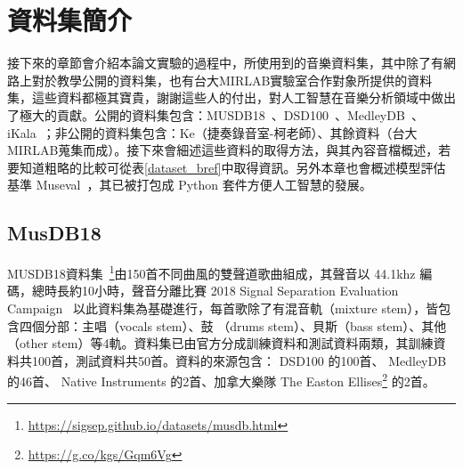 \chapter{資料集簡介}
接下來的章節會介紹本論文實驗的過程中，所使用到的音樂資料集，其中除了有網路上對於教學公開的資料集，也有台大MIRLAB實驗室合作對象所提供的資料集，這些資料都極其寶貴，謝謝這些人的付出，對人工智慧在音樂分析領域中做出了極大的貢獻。公開的資料集包含：MUSDB18~\cite{rafii2017musdb18,musdb18}、DSD100~\cite{SiSEC16}、MedleyDB~\cite{bittner2014medleydb}、iKala~\cite{chan2015vocal}；非公開的資料集包含：Ke（捷奏錄音室-柯老師）、其餘資料（台大MIRLAB蒐集而成）。接下來會細述這些資料的取得方法，與其內容音檔概述，若要知道粗略的比較可從表\ref{dataset_bref}中取得資訊。另外本章也會概述模型評估基準 Museval~\cite{stoter20182018}，其已被打包成 Python 套件方便人工智慧的發展。

\begin{table}[h!]
\centering
{}
\caption{資料集概述}
\label{dataset_bref}
\end{table}

\section{MusDB18}
MUSDB18資料集~\cite{rafii2017musdb18,musdb18}\footnote{\url{https://sigsep.github.io/datasets/musdb.html}}由150首不同曲風的雙聲道歌曲組成，其聲音以 44.1khz 編碼，總時長約10小時，聲音分離比賽 2018 Signal Separation Evaluation Campaign~\cite{stoter20182018} 以此資料集為基礎進行，每首歌除了有混音軌（mixture stem），皆包含四個分部：主唱（vocals stem）、鼓 （drums stem）、貝斯（bass stem）、其他（other stem）等4軌。資料集已由官方分成訓練資料和測試資料兩類，其訓練資料共100首，測試資料共50首。資料的來源包含： DSD100 的100首、 MedleyDB 的46首、 Native Instruments 的2首、加拿大樂隊 The Easton Ellises\footnote{\url{https://g.co/kgs/Gqm6Vg}} 的2首。

